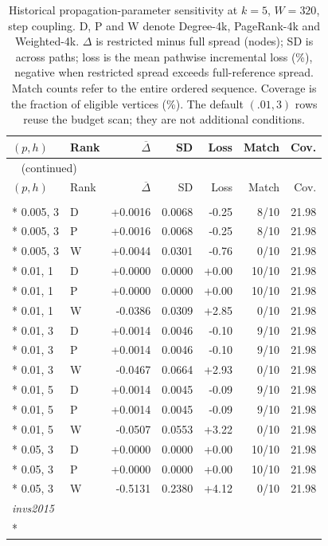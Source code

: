 \begin{longtable}{llrrrrr}
\caption{Historical propagation-parameter sensitivity at $k=5$, $W=320$, step coupling. D, P and W denote Degree-4k, PageRank-4k and Weighted-4k. $\Delta$ is restricted minus full spread (nodes); SD is across paths; loss is the mean pathwise incremental loss (\%), negative when restricted spread exceeds full-reference spread. Match counts refer to the entire ordered sequence. Coverage is the fraction of eligible vertices (\%). The default $(.01,3)$ rows reuse the budget scan; they are not additional conditions.}\label{tab:hist-parameters}\\
\toprule
$(p,h)$ & Rank & $\overline\Delta$ & SD & Loss & Match & Cov. \\
\midrule
\endfirsthead
\multicolumn{7}{l}{\tablename~\thetable{} (continued)}\\
\toprule
$(p,h)$ & Rank & $\overline\Delta$ & SD & Loss & Match & Cov. \\
\midrule
\endhead
\bottomrule
\endfoot
\multicolumn{7}{l}{\textit{invs2013}}\\*
0.005, 3 & D & +0.0016 & 0.0068 & -0.25 & 8/10 & 21.98\\*
0.005, 3 & P & +0.0016 & 0.0068 & -0.25 & 8/10 & 21.98\\*
0.005, 3 & W & +0.0044 & 0.0301 & -0.76 & 0/10 & 21.98\\*
0.01, 1 & D & +0.0000 & 0.0000 & +0.00 & 10/10 & 21.98\\*
0.01, 1 & P & +0.0000 & 0.0000 & +0.00 & 10/10 & 21.98\\*
0.01, 1 & W & -0.0386 & 0.0309 & +2.85 & 0/10 & 21.98\\*
0.01, 3 & D & +0.0014 & 0.0046 & -0.10 & 9/10 & 21.98\\*
0.01, 3 & P & +0.0014 & 0.0046 & -0.10 & 9/10 & 21.98\\*
0.01, 3 & W & -0.0467 & 0.0664 & +2.93 & 0/10 & 21.98\\*
0.01, 5 & D & +0.0014 & 0.0045 & -0.09 & 9/10 & 21.98\\*
0.01, 5 & P & +0.0014 & 0.0045 & -0.09 & 9/10 & 21.98\\*
0.01, 5 & W & -0.0507 & 0.0553 & +3.22 & 0/10 & 21.98\\*
0.05, 3 & D & +0.0000 & 0.0000 & +0.00 & 10/10 & 21.98\\*
0.05, 3 & P & +0.0000 & 0.0000 & +0.00 & 10/10 & 21.98\\*
0.05, 3 & W & -0.5131 & 0.2380 & +4.12 & 0/10 & 21.98\\
\multicolumn{7}{l}{\textit{invs2015}}\\*

\end{longtable}
